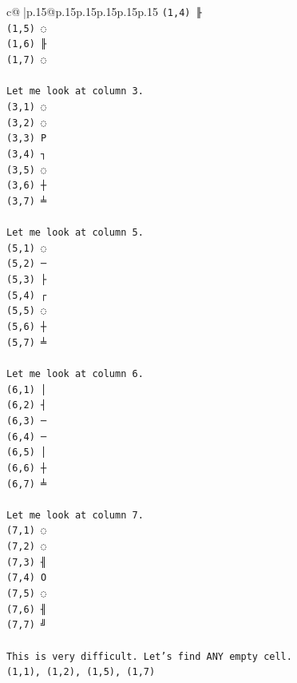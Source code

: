 \documentclass{article}
\begin{document}
{\begin{supertabular}{c@{$\;$}|p{.15\linewidth}@{}p{.15\linewidth}p{.15\linewidth}p{.15\linewidth}p{.15\linewidth}p{.15\linewidth}}
{{{\texttt{(1,4) ╟} \\
\texttt{(1,5) ◌} \\
\texttt{(1,6) ╟} \\
\texttt{(1,7) ◌} \\
\\ 
\texttt{Let me look at column 3.} \\
\texttt{(3,1) ◌} \\
\texttt{(3,2) ◌} \\
\texttt{(3,3) P} \\
\texttt{(3,4) ┐} \\
\texttt{(3,5) ◌} \\
\texttt{(3,6) ┼} \\
\texttt{(3,7) ╧} \\
\\ 
\texttt{Let me look at column 5.} \\
\texttt{(5,1) ◌} \\
\texttt{(5,2) ─} \\
\texttt{(5,3) ├} \\
\texttt{(5,4) ┌} \\
\texttt{(5,5) ◌} \\
\texttt{(5,6) ┼} \\
\texttt{(5,7) ╧} \\
\\ 
\texttt{Let me look at column 6.} \\
\texttt{(6,1) │} \\
\texttt{(6,2) ┤} \\
\texttt{(6,3) ─} \\
\texttt{(6,4) ─} \\
\texttt{(6,5) │} \\
\texttt{(6,6) ┼} \\
\texttt{(6,7) ╧} \\
\\ 
\texttt{Let me look at column 7.} \\
\texttt{(7,1) ◌} \\
\texttt{(7,2) ◌} \\
\texttt{(7,3) ╢} \\
\texttt{(7,4) O} \\
\texttt{(7,5) ◌} \\
\texttt{(7,6) ╢} \\
\texttt{(7,7) ╝} \\
\\ 
\texttt{This is very difficult. Let's find ANY empty cell.} \\
\texttt{(1,1), (1,2), (1,5), (1,7)} \\
}}}
\end{supertabular}}
\end{document}
